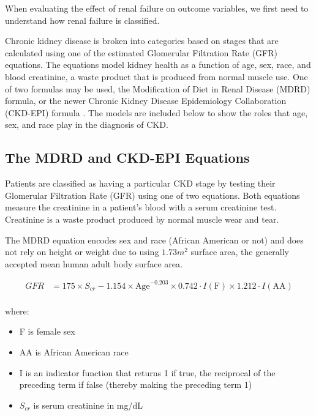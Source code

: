 \documentclass[12pt]{ociamthesis}\usepackage[]{graphicx}\usepackage[]{color}
\begin{document}
When evaluating the effect of renal failure on outcome variables, we first need to understand how renal failure is classified.

Chronic kidney disease is broken into categories based on stages that are calculated using one of the estimated Glomerular Filtration Rate
(GFR) equations. The equations model kidney health as a function of age, sex, race, and blood creatinine, a waste product that is produced from
normal muscle use. One of two formulas may be used, the Modification of Diet in Renal Disease (MDRD) formula, or the newer
Chronic Kidney Disease Epidemiology Collaboration (CKD-EPI) formula \cite{eGFR2018}. The models are included below to show the roles that
age, sex, and race play in the diagnosis of CKD.

\subsection{The MDRD and CKD-EPI Equations}

Patients are classified as having a particular CKD stage by testing their Glomerular Filtration Rate (GFR) using one of two equations.
Both equations measure the creatinine in a patient's blood with a serum creatinine test. Creatinine is a waste product produced by normal
muscle wear and tear. 

The MDRD equation encodes sex and race (African American or not) and does not rely on height or weight due to using $1.73m^2$ surface area,
the generally accepted mean human adult body surface area. 

\begin{equation} \label{mdrd}
\begin{split}
  GFR  &= 175 \times S_{cr} - 1.154 \times \text{Age}^{-0.203} \times 0.742 \cdot I(\text{F}) \times 1.212 \cdot I(\text{AA}) \\
\end{split}
\end{equation}

where:
\begin{itemize}
  \item F is female sex
  \item AA is African American race
  \item I is an indicator function that returns 1 if true, the reciprocal of the preceding term if false (thereby making the preceding term 1)
  \item $S_{cr}$ is serum creatinine in mg/dL
\end{itemize} \cite{Levey1999}
\end{document}
